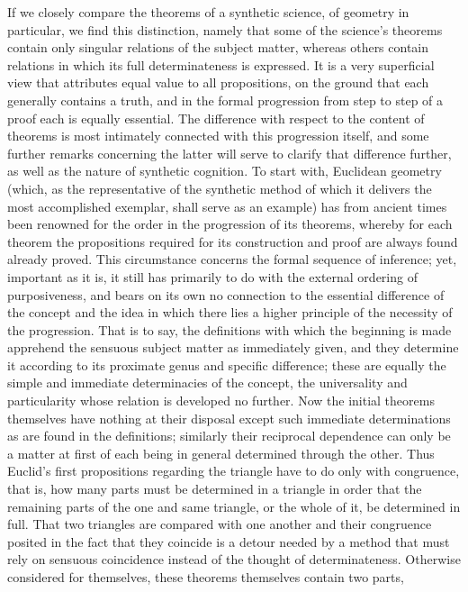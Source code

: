 If we closely compare the theorems of a synthetic science,
of geometry in particular, we find this distinction,
namely that some of the science's theorems
contain only singular relations of the subject matter,
whereas others contain relations in which
its full determinateness is expressed.
It is a very superficial view
that attributes equal value to all propositions,
on the ground that each generally contains a truth,
and in the formal progression from step to step of
a proof each is equally essential.
The difference with respect to the content of theorems is
most intimately connected with this progression itself,
and some further remarks concerning the latter will
serve to clarify that difference further,
as well as the nature of synthetic cognition.
To start with, Euclidean geometry
(which, as the representative of the synthetic method
of which it delivers the most accomplished exemplar,
shall serve as an example)
has from ancient times been renowned
for the order in the progression of its theorems,
whereby for each theorem the propositions required
for its construction and proof are
always found already proved.
This circumstance concerns the formal sequence of inference;
yet, important as it is, it still has primarily to do
with the external ordering of purposiveness,
and bears on its own no connection
to the essential difference of the concept
and the idea in which there lies
a higher principle of
the necessity of the progression.
That is to say, the definitions
with which the beginning is made
apprehend the sensuous subject matter
as immediately given,
and they determine it according to
its proximate genus and specific difference;
these are equally the simple and immediate
determinacies of the concept,
the universality and particularity
whose relation is developed no further.
Now the initial theorems themselves have
nothing at their disposal except
such immediate determinations
as are found in the definitions;
similarly their reciprocal dependence can only be
a matter at first of each being in general
determined through the other.
Thus Euclid's first propositions regarding
the triangle have to do only with congruence,
that is, how many parts must be determined
in a triangle in order that
the remaining parts of the one and same triangle,
or the whole of it, be determined in full.
That two triangles are compared with one another
and their congruence posited in
the fact that they coincide is
a detour needed by a method that must rely on
sensuous coincidence instead of the thought of determinateness.
Otherwise considered for themselves,
these theorems themselves contain two parts,

